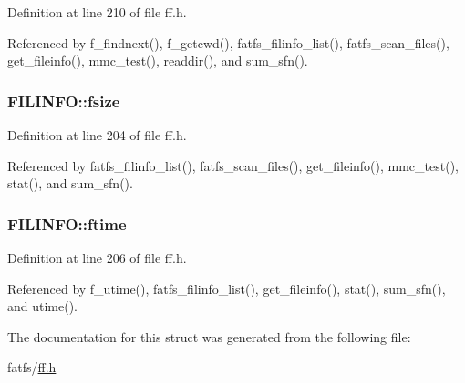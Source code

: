 Definition at line 210 of file ff.\+h.



Referenced by f\+\_\+findnext(), f\+\_\+getcwd(), fatfs\+\_\+filinfo\+\_\+list(), fatfs\+\_\+scan\+\_\+files(), get\+\_\+fileinfo(), mmc\+\_\+test(), readdir(), and sum\+\_\+sfn().

\subsubsection[{\texorpdfstring{fsize}{fsize}}]{ F\+I\+L\+I\+N\+F\+O\+::fsize}\hypertarget{structFILINFO_a9e5b78ed7190f73de3ebcbdfbd6d1844}{}\label{structFILINFO_a9e5b78ed7190f73de3ebcbdfbd6d1844}


Definition at line 204 of file ff.\+h.



Referenced by fatfs\+\_\+filinfo\+\_\+list(), fatfs\+\_\+scan\+\_\+files(), get\+\_\+fileinfo(), mmc\+\_\+test(), stat(), and sum\+\_\+sfn().

\subsubsection[{\texorpdfstring{ftime}{ftime}}]{ F\+I\+L\+I\+N\+F\+O\+::ftime}\hypertarget{structFILINFO_ae0f751b79621bf7b29669f177bbe6b9a}{}\label{structFILINFO_ae0f751b79621bf7b29669f177bbe6b9a}


Definition at line 206 of file ff.\+h.



Referenced by f\+\_\+utime(), fatfs\+\_\+filinfo\+\_\+list(), get\+\_\+fileinfo(), stat(), sum\+\_\+sfn(), and utime().



The documentation for this struct was generated from the following file\+:\begin{DoxyCompactItemize}
\item 
fatfs/\hyperlink{ff_8h}{ff.\+h}\end{DoxyCompactItemize}

